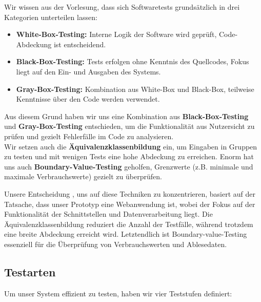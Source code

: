 Wir wissen aus der Vorlesung, dass sich Softwaretests grundsätzlich in drei Kategorien unterteilen lassen:

\begin{itemize}
	\item \textbf{White-Box-Testing:} Interne Logik der Software wird geprüft, Code-Abdeckung ist entscheidend.
	\item \textbf{Black-Box-Testing:} Tests erfolgen ohne Kenntnis des Quellcodes, Fokus liegt auf den Ein- und Ausgaben des Systems.
	\item \textbf{Gray-Box-Testing:} Kombination aus White-Box und Black-Box, teilweise Kenntnisse über den Code werden verwendet.
\end{itemize}

Aus diesem Grund  haben wir uns eine Kombination aus \textbf{Black-Box-Testing} und \textbf{Gray-Box-Testing} entschieden, um die Funktionalität aus Nutzersicht zu prüfen und gezielt Fehlerfälle im Code zu analysieren.\\
Wir setzen auch die \textbf{Äquivalenzklassenbildung} ein, um Eingaben in Gruppen zu testen und mit wenigen Tests eine hohe Abdeckung zu erreichen.
Enorm hat uns auch \textbf{Boundary-Value-Testing} geholfen, Grenzwerte (z.B. minimale und maximale Verbrauchswerte) gezielt zu überprüfen.

Unsere Entscheidung , uns auf diese Techniken zu konzentrieren, basiert auf der Tatsache, dass unser
Prototyp eine Webanwendung ist, wobei der Fokus auf der Funktionalität der Schnittstellen und Datenverarbeitung liegt.
Die Äquivalenzklassenbildung reduziert die Anzahl der Testfälle, während trotzdem eine breite Abdeckung erreicht wird.
Letztendlich ist Boundary-value-Testing essenziell für die Überprüfung von Verbrauchswerten und Ablesedaten.

\subsection{Testarten}\label{subsec:testarten}

Um unser System effizient zu testen, haben wir vier Teststufen definiert:

